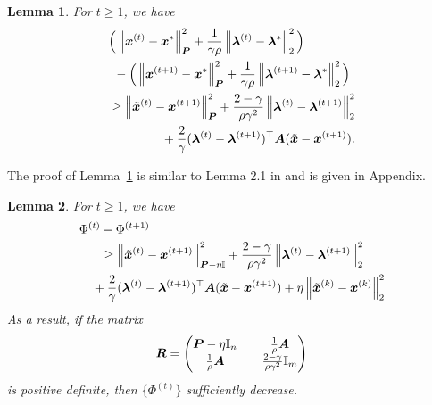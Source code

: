 \documentclass[twocolumn,amsthm]{autart}%
\theoremstyle{definition}
\theoremstyle{plain}
\newtheorem{lemma}{Lemma}
\begin{document}
\begin{lemma}
\label{lem:first-ineq}
For $t \ge 1$, we have
\begin{equation}
\label{eq:lem1a}
\begin{multlined}
\Big( \norm{\bbsym{x}^{(t)}-\bbsym{x}^{*}}^2_{\bbsym{P}}
+ \frac{1}{\gamma \rho} \norm{\bbsym{\lambda}^{(t)}-\bbsym{\lambda}^{*}}_2^2 \Big) \\
- \Big(\norm{\bbsym{x}^{(t+1)}-\bbsym{x}^{*}}^2_{\bbsym{P}}
+ \frac{1}{\gamma \rho} \norm{\bbsym{\lambda}^{(t+1)}-\bbsym{\lambda}^{*}}_2^2 \Big) \\
\ge \norm{\xtil^{(t)}-\bbsym{x}^{(t+1)}}_{\bbsym{P}}^2
+ \frac{2-\gamma}{\rho \gamma^2} \norm{\bbsym{\lambda}^{(t)}-\bbsym{\lambda}^{(t+1)}}_2^2 \\
+ \frac{2}{\gamma} (\bbsym{\lambda}^{(t)}-\bbsym{\lambda}^{(t+1)})^\top \bbsym{A} (\xtil-\bbsym{x}^{(t+1)}).
\end{multlined}
\end{equation}
\end{lemma}

The proof of Lemma~\ref{lem:first-ineq} is similar to Lemma 2.1 in \cite{deng2017parallel} and is given in Appendix.

\begin{lemma}
\label{lem:suff-decrease}
For $t \ge 1$, we have
\begin{equation}
\label{eq:fcn_decrease}
\begin{multlined}
\Phi^{(t)} - \Phi^{(t+1)}  \\
\ge \norm{\xtil^{(t)}-\bbsym{x}^{(t+1)}}_{\bbsym{P}-\eta \II}^2
+ \frac{2-\gamma}{\rho \gamma^2} \norm{\bbsym{\lambda}^{(t)}-\bbsym{\lambda}^{(t+1)}}_2^2 \\
+ \frac{2}{\gamma} (\bbsym{\lambda}^{(t)}-\bbsym{\lambda}^{(t+1)})^\top \bbsym{A} (\xtil-\bbsym{x}^{(t+1)})
+ \eta \norm{\xtil^{(k)}-\bbsym{x}^{(k)}}_2^2
\end{multlined}
\end{equation}
As a result, if the matrix 
\begin{equation}
\boldsymbol{R} = 
\begin{pmatrix}
\boldsymbol{P} - \eta \mathbb{I}_n & \quad \frac{1}{\rho} \boldsymbol{A} \\
\frac{1}{\rho} \boldsymbol{A} & \quad \frac{2-\gamma}{\rho \gamma^2} \mathbb{I}_m \\
\end{pmatrix}
\end{equation}
is positive definite, then $\{\Phi^{(t)}\}$ sufficiently decrease.
\end{lemma}
\end{document}
